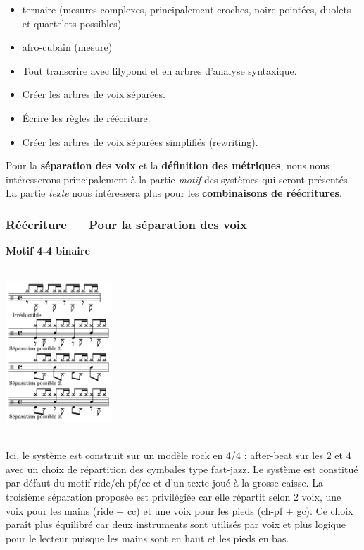 \begin{itemize}
	\item ternaire (mesures complexes, principalement croches, noire pointées, duolets et quartelets possibles)
	\item afro-cubain (mesure)
	\item Tout transcrire avec lilypond et en arbres d’analyse syntaxique.
	\item Créer les arbres de voix séparées.
	\item Écrire les règles de réécriture.
	\item Créer les arbres de voix séparées simplifiés (rewriting).\\	
\end{itemize}

Pour la \textbf{séparation des voix} et la \textbf{définition des métriques}, nous nous intéresserons principalement à la partie \textit{motif} des systèmes qui seront présentés. La partie \textit{texte} nous intéressera plus pour les \textbf{combinaisons de réécritures}.
\newpage
\subsubsection{Réécriture — Pour la séparation des voix}
\label{sys_sep_voix}
\textbf{Motif 4-4 binaire}\\\\
\includegraphics[height=60mm, width=40mm]{z_images/3_methodes/2_systemes/0_separation_4-4_binaire.png}\\\\
Ici, le système est construit sur un modèle rock en 4/4 : after-beat sur les 2 et 4 avec un choix de répartition des cymbales type fast-jazz. Le système est constitué par défaut du motif ride/ch-pf/cc et d’un texte joué à la grosse-caisse. La troisième séparation proposée est privilégiée car elle répartit selon 2 voix, une voix pour les mains (ride + cc) et une voix pour les pieds (ch-pf + gc). Ce choix paraît plus équilibré car deux instruments sont utilisés par voix et plus logique pour le lecteur puisque les mains sont en haut et les pieds en bas.\\

